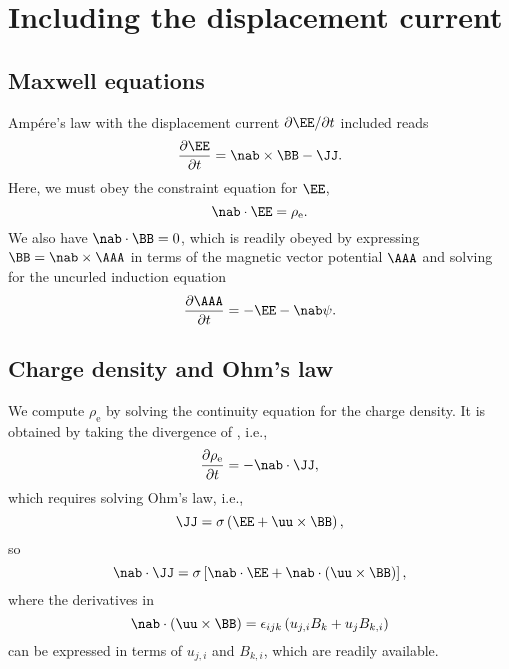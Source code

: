\documentclass{article}
\title{}
\author{}
\date{\today,~ $ $Revision: 1.106 $ $}
\begin{document}

\section{Including the displacement current}

\subsection{Maxwell equations}

Amp\'ere's law with the displacement current $\partial\EE/\partial t$
included reads
\begin{equation}
\frac{\partial\EE}{\partial t}=\nab\times\BB-\JJ.
\label{dEdt}
\end{equation}
Here, we must obey the constraint equation for $\EE$,
\begin{equation}
\nab\cdot\EE=\rho_\mathrm{e}.
\label{constraint}
\end{equation}
We also have $\nab\cdot\BB=0$, which is readily obeyed by expressing
$\BB=\nab\times\AAA$ in terms of the magnetic vector potential $\AAA$
and solving for the uncurled induction equation
\begin{equation}
\frac{\partial\AAA}{\partial t}=-\EE-\nab\psi.
\label{dAdt}
\end{equation}

\subsection{Charge density and Ohm's law}

We compute $\rho_\mathrm{e}$ by solving the continuity equation for the
charge density.
It is obtained by taking the divergence of , i.e.,
\begin{equation}
\frac{\partial\rho_\mathrm{e}}{\partial t}=-\nab\cdot\JJ,
\label{drhoedt}
\end{equation}
which requires solving Ohm's law, i.e.,
\begin{equation}
\JJ=\sigma\left(\EE+\uu\times\BB\right),
\label{Ohm}
\end{equation}
so
\begin{equation}
\nab\cdot\JJ=\sigma\left[\nab\cdot\EE+\nab\cdot(\uu\times\BB)\right],
\label{divOhm}
\end{equation}
where the derivatives in
\begin{equation}
\nab\cdot(\uu\times\BB)=\epsilon_{ijk}\left(u_{j,i}B_k+u_j B_{k,i}\right)
\label{divuxB}
\end{equation}
can be expressed in terms of $u_{j,i}$ and $B_{k,i}$, which are readily
available.
\end{document}
